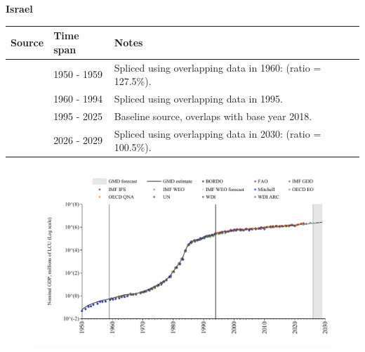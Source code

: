 \documentclass[12pt,a4paper,landscape]{article}
\begin{document}
\begin{adjustbox}{max totalsize={\paperwidth}{\paperheight},center}
\begin{minipage}[t][\textheight][t]{\textwidth}
\vspace*{0.5cm}
{}
\begin{center}
{\Large\bfseries Israel}
\end{center}
\vspace{0.5cm}
\begin{table}[H]
\centering
\small
\begin{tabular}{|l|l|l|}
\hline
\textbf{Source} & \textbf{Time span} & \textbf{Notes} \\
\hline
\rowcolor{white}\cite{IMF_GDD}& 1950 - 1959 &Spliced using overlapping data in 1960: (ratio = 127.5\%).\\
\rowcolor{lightgray}\cite{WDI}& 1960 - 1994 &Spliced using overlapping data in 1995.\\
\rowcolor{white}\cite{OECD_EO}& 1995 - 2025 &Baseline source, overlaps with base year 2018.\\
\rowcolor{lightgray}\cite{IMF_WEO_forecast}& 2026 - 2029 &Spliced using overlapping data in 2030: (ratio = 100.5\%).\\
\hline
\end{tabular}
\end{table}
\begin{figure}[H]
\centering
\includegraphics[width=\textwidth,height=0.6\textheight,keepaspectratio]{graphs/ISR_nGDP.pdf}
\end{figure}
\end{minipage}
\end{adjustbox}
\end{document}

